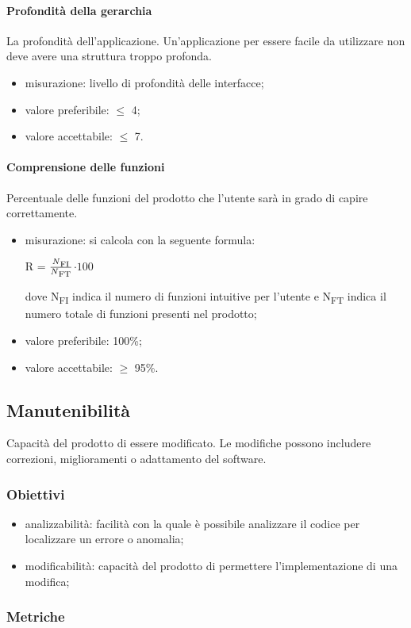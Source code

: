 			\paragraph{Profondità della gerarchia}
			La profondità dell'applicazione. Un'applicazione per essere facile da utilizzare non deve avere una struttura troppo profonda.
			\begin{itemize}
			\item misurazione: livello di profondità delle interfacce;
			\item valore preferibile: $\leq$ 4;
			\item valore accettabile: $\leq$ 7.
			\end{itemize}
			\paragraph{Comprensione delle funzioni}
			Percentuale delle funzioni del prodotto che l'utente sarà in grado di capire correttamente.
			\begin{itemize}
				\item misurazione: si calcola con la seguente formula: \\
			\centerline{ R =  \(\frac{N\textsubscript{FI}}{N\textsubscript{FT}} \)$ \cdot 100$ }
			dove N\textsubscript{FI} indica il numero di funzioni intuitive per l'utente e N\textsubscript{FT} indica il numero totale di funzioni presenti nel prodotto;
				\item valore preferibile: 100\%;
				\item valore accettabile: $\geq$ 95\%.
			\end{itemize}
	\subsection{Manutenibilità}
	Capacità del prodotto di essere modificato. Le modifiche possono includere correzioni, miglioramenti o adattamento del software.
		\subsubsection{Obiettivi}
		\begin{itemize}
			\item analizzabilità: facilità con la quale è possibile analizzare il codice per localizzare un errore o anomalia;
			\item modificabilità: capacità del prodotto di permettere l'implementazione di una modifica;
		\end{itemize}
		\subsubsection{Metriche}
